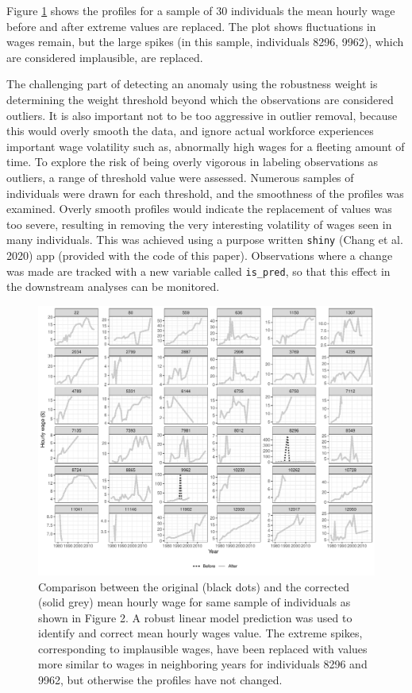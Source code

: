\documentclass{article}
\begin{document}
Figure \ref{fig:compare-plot} shows the profiles for a sample of 30 individuals the mean hourly wage before and after extreme values are replaced. The plot shows fluctuations in wages remain, but the large spikes (in this sample, individuals 8296, 9962), which are considered implausible, are replaced.

The challenging part of detecting an anomaly using the robustness weight is determining the weight threshold beyond which the observations are considered outliers. It is also important not to be too aggressive in outlier removal, because this would overly smooth the data, and ignore actual workforce experiences important wage volatility such as, abnormally high wages for a fleeting amount of time. To explore the risk of being overly vigorous in labeling observations as outliers, a range of threshold value were assessed. Numerous samples of individuals were drawn for each threshold, and the smoothness of the profiles was examined. Overly smooth profiles would indicate the replacement of values was too severe, resulting in removing the very interesting volatility of wages seen in many individuals. This was achieved using a purpose written \texttt{shiny} (Chang et al. 2020) app (provided with the code of this paper). Observations where a change was made are tracked with a new variable called \texttt{is\_pred}, so that this effect in the downstream analyses can be monitored.

\begin{figure}

{\centering \includegraphics[width=0.9\linewidth]{figures/compare-plot-1} 

}

\caption{Comparison between the original (black dots) and the corrected (solid grey) mean hourly wage for same sample of individuals as shown in Figure 2. A robust linear model prediction was used to identify and correct mean hourly wages value. The extreme spikes, corresponding to implausible wages, have been replaced with values more similar to wages in neighboring years for individuals 8296 and 9962, but otherwise the profiles have not changed.}\label{fig:compare-plot}
\end{figure}
\end{document}

